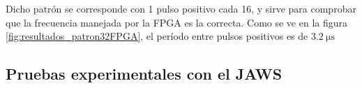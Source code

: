 \documentclass[twoside]{article}
\begin{document}
\begin{multicols}{2}
    Dicho patrón se corresponde con 1 pulso positivo cada 16, y sirve para comprobar que la frecuencia manejada por la FPGA es la correcta. Como se ve en la figura \ref{fig:resultados_patron32FPGA}, el período entre pulsos positivos es de $\SI{3.2}{\micro\second}$

    \subsection{Pruebas experimentales con el JAWS}



\end{multicols}





\nocite{*} %
\end{document}
